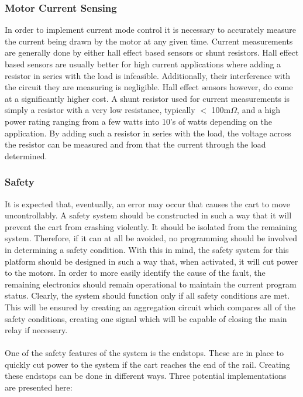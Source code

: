 \subsubsection{Motor Current Sensing}
In order to implement current mode control it is necessary to accurately measure the current being drawn by the motor at any given time.
Current measurements are generally done by either hall effect based sensors or shunt resistors. 
Hall effect based sensors are usually better for high current applications where adding a resistor in series with the load is infeasible. 
Additionally, their interference with the circuit they are measuring is negligible.
Hall effect sensors however, do come at a significantly higher cost.
A shunt resistor used for current measurements is simply a resistor with a very low resistance, typically $<$ 100m$\Omega$, and a high power rating ranging from a few watts into 10's of watts depending on the application.
By adding such a resistor in series with the load, the voltage across the resistor can be measured and from that the current through the load determined.


\subsubsection{Safety} %
\label{subsub:safety}
It is expected that, eventually, an error may occur that causes the cart to move uncontrollably.
A safety system should be constructed in such a way that it will prevent the cart from crashing violently.
It should be isolated from the remaining system.
Therefore, if it can at all be avoided, no programming should be involved in determining a safety condition.
With this in mind, the safety system for this platform should be designed in such a way that, when activated, it will cut power to the motors.
In order to more easily identify the cause of the fault, the remaining electronics should remain operational to maintain the current program status.
Clearly, the system should function only if all safety conditions are met.
This will be ensured by creating an aggregation circuit which compares all of the safety conditions, creating one signal which will be capable of closing the main relay if necessary.
\\~\\
One of the safety features of the system is the endstops.
These are in place to quickly cut power to the system if the cart reaches the end of the rail.
Creating these endstops can be done in different ways.
Three potential implementations are presented here:
